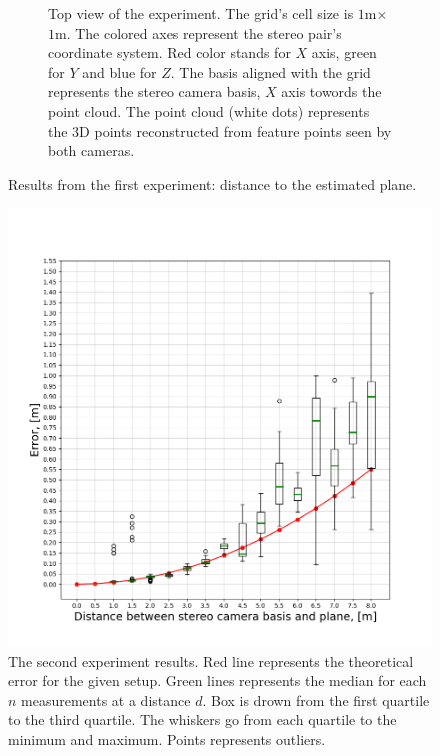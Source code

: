 \begin{figure}[ht]
\begin{subfigure}[ht]{0.49\textwidth}
    \caption[Top view of the experiment.]{Top view of the experiment. 
    The grid's cell size is $1$m$\times$$1$m.
    The colored axes represent the stereo pair's coordinate system.
    Red color stands for $X$ axis, green for $Y$ and blue for $Z$.
    The basis aligned with the grid represents the stereo camera basis, $X$ axis towords the point cloud.
    The point cloud (white dots) represents the 3D points reconstructed from feature points seen by both cameras.}
    \label{fig:exp_1_topview}
  \end{subfigure}
  \caption{Results from the first experiment: distance to the estimated plane.}
  \label{fig:exp_1_exp}
\end{figure}

\begin{figure}[ht]
    \centering
    \includegraphics[width=\textwidth]{graphics/experiment_2_general.png}
  \caption[The second experiment results.]{The second experiment results. Red line represents the theoretical error for the given setup.
  Green lines represents the median for each $n$ measurements at a distance $d$. Box is drown from the first quartile to the third quartile.
  The whiskers go from each quartile to the minimum and maximum.
  Points represents outliers.}
  \label{fig:exp_2_general}
\end{figure}

